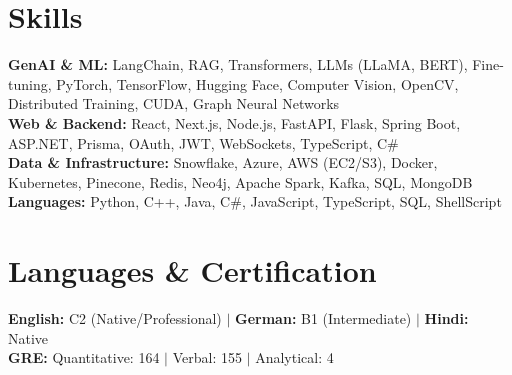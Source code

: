 \documentclass[10pt,a4paper]{article}
\begin{document}
\section{Skills}
\begin{itemize}[label={}]
    \small{\item{
     \textbf{GenAI \& ML:}{ LangChain, RAG, Transformers, LLMs (LLaMA, BERT), Fine-tuning, PyTorch, TensorFlow, Hugging Face, Computer Vision, OpenCV, Distributed Training, CUDA, Graph Neural Networks} \\
     \textbf{Web \& Backend:}{ React, Next.js, Node.js, FastAPI, Flask, Spring Boot, ASP.NET, Prisma, OAuth, JWT, WebSockets, TypeScript, C\#} \\
     \textbf{Data \& Infrastructure:}{ Snowflake, Azure, AWS (EC2/S3), Docker, Kubernetes, Pinecone, Redis, Neo4j, Apache Spark, Kafka, SQL, MongoDB} \\
     \textbf{Languages:}{ Python, C++, Java, C\#, JavaScript, TypeScript, SQL, ShellScript}
    }}
\end{itemize}

\section{Languages \& Certification}
\begin{itemize}[label={}]
    \small{\item{
     \textbf{English:}{ C2 (Native/Professional)} $|$ \textbf{German:}{ B1 (Intermediate)} $|$ \textbf{Hindi:}{ Native} \\
     \textbf{GRE:}{ Quantitative: 164 $|$ Verbal: 155 $|$ Analytical: 4}
    }}
\end{itemize}
\end{document}

